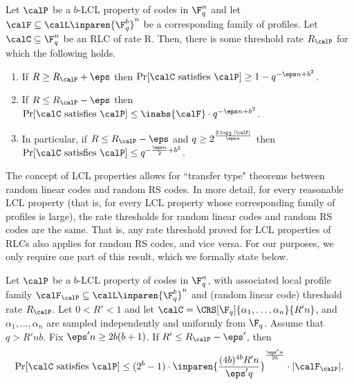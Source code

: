 \documentclass{article}
\begin{document}
\begin{theorem}\label{thm:LMS-RLC-thresh}
    Let $\calP$ be a $b$-LCL property of codes in $\F_q^n$ and let $\calF\subseteq \calL\inparen{\F_q^b}^n$ be a corresponding family of profiles. Let $\calC\subseteq \F_q^n$ be an RLC of rate R. Then, there is some threshold rate $R_\calP$ for which the following holds.
    \begin{enumerate}
        \item If $R \ge R_{\calP}+\eps$ then $\Pr[\calC\textrm{ satisfies }\calP] \ge 1 - q^{-\eps n+b^2}$.
        \item If $R \le R_{\calP}-\eps$ then $\Pr[\calC\textrm{ satisfies }\calP] \le \inabs{\calF}\cdot q^{-\eps n + b^2}$.
        \item In particular, if $R \le R_{\calP}-\eps$ and $q \ge 2^{\frac{2\log_2 |\calF|}{\eps n}}$ then $\Pr[\calC\textrm{ satisfies }\calP] \le q^{-\frac{\eps n}2 + b^2}$.
    \end{enumerate}
\end{theorem}

The concept of LCL properties allows for ``transfer type" theorems between random linear codes and random RS codes. In more detail, for every reasonable LCL property (that is, for every LCL property whose corresponding family of profiles is large), the rate thresholds for random linear codes and random RS codes are the same. That is, any rate threshold proved for LCL properties of RLCs also applies for random RS codes, and vice versa. For our purposes, we only require one part of this result, which we formally state below.
\begin{theorem}\label{thm:lms-red}
    Let $\calP$ be a $b$-LCL property of codes in $\F_q^n$, with associated local profile family $\calF_\calP \subseteq \calL\inparen{\F_q^b}^n$ and (random linear code) threshold rate $R_\calP$.
    Let $0 < R' < 1$ and let $\calC = \CRS[\F_q]{\alpha_1,\dots,\alpha_n}{R'n}$, and $\alpha_1,\dots,\alpha_n$ are sampled independently and uniformly from $\F_q$.
    Assume that $q > R'nb$.
    Fix $\eps' n \ge 2b(b+1)$.
    If $R'\le R_\calP-\eps'$, then 
          \begin{equation}\label{eq:MainReductionRLCtoRS}
              \Pr [\calC \textrm{ satisfies }\calP] \le (2^b-1) \cdot \inparen{\frac {(4b)^{4b}R'n}  {\eps' q}}^{\frac{\eps' n}{2b}} \cdot |\calF_\calP|.
          \end{equation}
\end{theorem}
\end{document}
